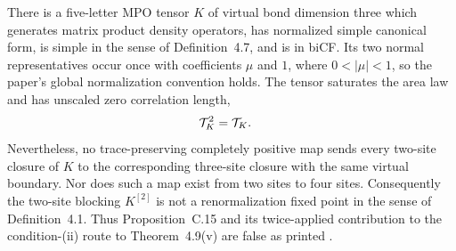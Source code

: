 \begin{lemma}
    \label{thm:mpdo_sal_zcl_blocking_channels}
    \leanok
    There is a five-letter MPO tensor $K$ of virtual bond dimension three
    which generates matrix product density operators, has normalized simple
    canonical form, is simple in the sense of Definition~4.7, and is in biCF.
    Its two normal representatives occur once with coefficients $\mu$ and $1$,
    where $0<|\mu|<1$, so the paper's global normalization convention holds.
    The tensor saturates the area law and has unscaled zero correlation length,
    \begin{align}
        \mathcal T_K^2 & =\mathcal T_K.
        \notag
    \end{align}
    Nevertheless, no trace-preserving completely positive map sends every
    two-site closure of $K$ to the corresponding three-site closure with the
    same virtual boundary. Nor does such a map exist from two sites to four
    sites. Consequently the two-site blocking $K^{[2]}$ is not a
    renormalization fixed point in the sense of Definition~4.1. Thus
    Proposition~C.15 and its twice-applied contribution to the condition-(ii)
    route to Theorem~4.9(v) are false as printed
    \cite{gap:cpsv16_prop_c15_blocking_channel_false}.
\end{lemma}

